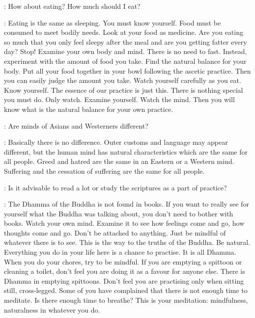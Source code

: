 :
How about eating? How much should I eat?

: Eating is the same as sleeping. You must know yourself. Food must be consumed to meet bodily needs. Look at your food as medicine. Are you eating so much that you only feel sleepy after the meal and are you getting fatter every day? Stop! Examine your own body and mind. There is no need to fast. Instead, experiment with the amount of food you take. Find the natural balance for your body. Put all your food together in your bowl following the ascetic practice. Then you can easily judge the amount you take. Watch yourself carefully as you eat. Know yourself. The essence of our practice is just this. There is nothing special you must do. Only watch. Examine yourself. Watch the mind. Then you will know what is the natural balance for your own practice.

:
Are minds of Asians and Westerners different?

: Basically there is no difference. Outer customs and language may appear different, but the human mind has natural characteristics which are the same for all people. Greed and hatred are the same in an Eastern or a Western mind. Suffering and the cessation of suffering are the same for all people.

:
Is it advisable to read a lot or study the scriptures as a part of practice?

: The Dhamma of the Buddha is not found in books. If you want to really see for yourself what the Buddha was talking about, you don't need to bother with books. Watch your own mind. Examine it to see how feelings come and go, how thoughts come and go. Don't be attached to anything. Just be mindful of whatever there is to see. This is the way to the truths of the Buddha. Be natural. Everything you do in your life here is a chance to practise. It is all Dhamma. When you do your chores, try to be mindful. If you are emptying a spittoon or cleaning a toilet, don't feel you are doing it as a favour for anyone else. There is Dhamma in emptying spittoons. Don't feel you are practising only when sitting still, cross-legged. Some of you have complained that there is not enough time to meditate. Is there enough time to breathe? This is your meditation: mindfulness, naturalness in whatever you do.


